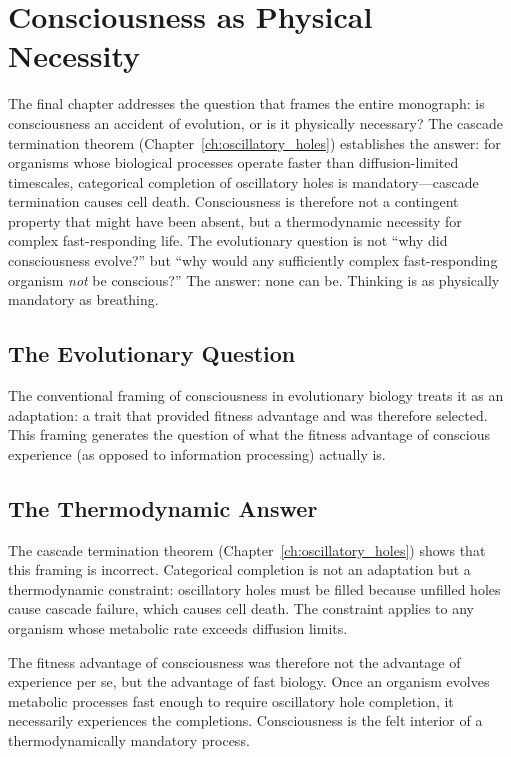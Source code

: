 \chapter{Consciousness as Physical Necessity}
\label{ch:necessity}

\begin{chapterabstract}
The final chapter addresses the question that frames the entire monograph: is consciousness an accident of evolution, or is it physically necessary? The cascade termination theorem (Chapter~\ref{ch:oscillatory_holes}) establishes the answer: for organisms whose biological processes operate faster than diffusion-limited timescales, categorical completion of oscillatory holes is mandatory---cascade termination causes cell death. Consciousness is therefore not a contingent property that might have been absent, but a thermodynamic necessity for complex fast-responding life. The evolutionary question is not ``why did consciousness evolve?'' but ``why would any sufficiently complex fast-responding organism \emph{not} be conscious?'' The answer: none can be. Thinking is as physically mandatory as breathing.
\end{chapterabstract}

\section{The Evolutionary Question}

The conventional framing of consciousness in evolutionary biology treats it as an adaptation: a trait that provided fitness advantage and was therefore selected. This framing generates the question of what the fitness advantage of conscious experience (as opposed to information processing) actually is.

\section{The Thermodynamic Answer}

The cascade termination theorem (Chapter~\ref{ch:oscillatory_holes}) shows that this framing is incorrect. Categorical completion is not an adaptation but a thermodynamic constraint: oscillatory holes must be filled because unfilled holes cause cascade failure, which causes cell death. The constraint applies to any organism whose metabolic rate exceeds diffusion limits.

The fitness advantage of consciousness was therefore not the advantage of experience per se, but the advantage of fast biology. Once an organism evolves metabolic processes fast enough to require oscillatory hole completion, it necessarily experiences the completions. Consciousness is the felt interior of a thermodynamically mandatory process.

